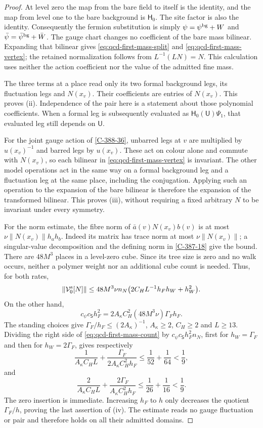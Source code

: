 \documentclass[11pt,letterpaper,reqno]{amsart}
\theoremstyle{definition}
\theoremstyle{remark}
\begin{document}
\begin{proof}
At level zero the map from the bare field to itself is the identity,
and the map from level one to the bare background is $\mathsf H_0$.
The site factor is also the identity.  Consequently the fermion
substitution is simply
$\psi=\psi^{\rm bg}+W$ and
$\bar\psi=\bar\psi^{\rm bg}+\bar W$.
The gauge chart changes no coefficient of the bare mass bilinear.
Expanding that bilinear gives \eqref{eq:qcd-first-mass-split} and
\eqref{eq:qcd-first-mass-vertex}; the retained normalization follows
from $L^{-1}(LN)=N$.  This calculation uses neither the action
coefficient nor the value of the admitted fine mass.

The three terms at a place read only its two formal background
legs, its fluctuation legs and $N(x_v)$.  Their coefficients are
entries of $N(x_v)$.  This proves (ii).  Independence of the pair
here is a statement about those polynomial coefficients.  When a
formal leg is subsequently evaluated as
$\mathsf H_0(\mathsf U)\Psi_1$, that evaluated leg still depends
on $\mathsf U$.

For the joint gauge action of \cref{C-388-36}, unbarred legs at $v$
are multiplied by $u(x_v)^{-1}$ and barred legs by $u(x_v)$.
These act on colour alone and commute with $N(x_v)$, so each
bilinear in \eqref{eq:qcd-first-mass-vertex} is invariant.
The other model operations act in the same way on a formal
background leg and a fluctuation leg at the same place, including
the conjugation.  Applying such an operation to the expansion of
the bare bilinear is therefore the expansion of the transformed
bilinear.  This proves (iii), without requiring a fixed arbitrary
$N$ to be invariant under every symmetry.

For the norm estimate, the fibre norm of
$\bar a(v)N(x_v)b(v)$ is at most
$\nu\|N(x_v)\|h_ah_b$.  Indeed its matrix has trace norm at most
$\nu\|N(x_v)\|$; a singular-value decomposition and the defining
norm in \cref{C-387-18} give the bound.  There are $48M^3$ places
in a level-zero cube.  Since its tree size is zero and no walk
occurs, neither a polymer weight nor an additional cube count is
needed.  Thus, for both rates,
\begin{equation}\label{eq:qcd-first-mass-count}
 \|\mathcal V^{\rm s}_0[N]\|
 \le48M^3\nu n_N
       \bigl(2C_HL^{-1}h_Fh_W+h_W^2\bigr).
\end{equation}
On the other hand,
\[
 c_\psi c_{\mathsf S}h_F^2
 =2A_\kappa C_H^2(48M^3\nu)\Gamma_Fh_F.
\]
The standing choices give
$\Gamma_F/h_F\le(2A_\kappa)^{-1}$, $A_\kappa\ge2$,
$C_H\ge2$ and $L\ge13$.  Dividing the right side of
\eqref{eq:qcd-first-mass-count} by
$c_\psi c_{\mathsf S}h_F^2n_N$, first for $h_W=\Gamma_F$ and
then for $h_W=2\Gamma_F$, gives respectively
\[
 \frac1{A_\kappa C_HL}
       +\frac{\Gamma_F}{2A_\kappa C_H^2h_F}
 \le\frac1{52}+\frac1{64}<\frac19,
\]
and
\[
 \frac2{A_\kappa C_HL}
       +\frac{2\Gamma_F}{A_\kappa C_H^2h_F}
 \le\frac1{26}+\frac1{16}<\frac19.
\]
The zero insertion is immediate.  Increasing $h_F$ to $h$ only
decreases the quotient $\Gamma_F/h$, proving the last assertion
of (iv).  The estimate reads no gauge fluctuation or pair and
therefore holds on all their admitted domains.


\end{proof}
\end{document}
